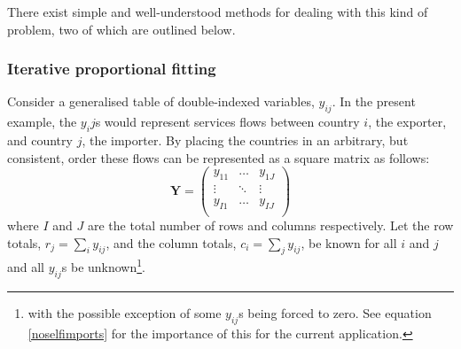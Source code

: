 \documentclass[preprint,authoryear,3p]{elsarticle}
\begin{document}
There exist simple and well-understood methods for dealing with this kind of problem, two of which are outlined below.





\subsubsection{Iterative proportional fitting} \label{iterativeproportionalfitting}
Consider a generalised table of double-indexed variables, $y_{ij}$. In the present example, the $y_ij$s would represent services flows between country $i$, the exporter, and country $j$, the importer. By placing the countries in an arbitrary, but consistent, order these flows can be represented as a square matrix as follows:
\begin{equation}
\textbf{Y} = \left(
\begin{array}{ccc}
y_{11} & \dots & y_{1J} \\
\vdots & \ddots & \vdots \\
y_{I1} & \dots & y_{IJ} \\
\end{array}
\right)
\end{equation}
where $I$ and $J$ are the total number of rows and columns respectively. Let the row totals, $r_j = \sum\limits_i y_{ij}$, and the column totals, $c_i = \sum\limits_{j} y_{ij}$, be known for all $i$ and $j$ and all $y_{ij}$s be unknown\footnote{with the possible exception of some $y_{ij}$s being forced to zero. See equation \ref{noselfimports} for the importance of this for the current application.}.
\end{document}
